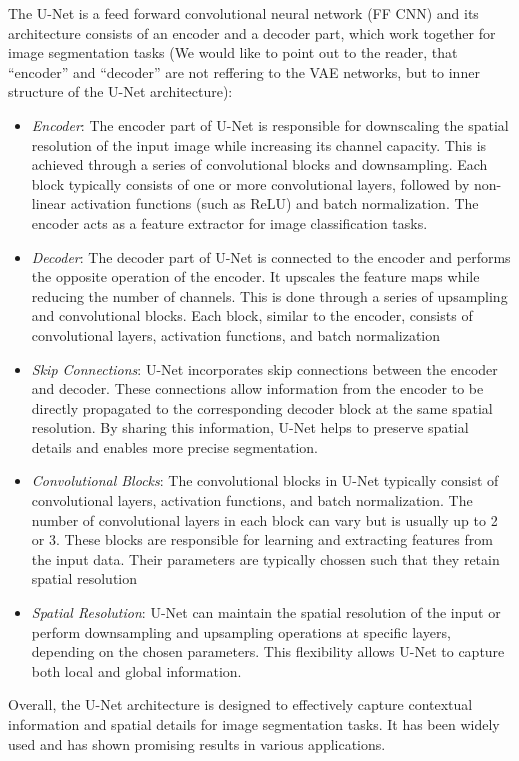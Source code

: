 The U-Net is a feed forward convolutional neural network (FF CNN) and its architecture consists of an encoder and a decoder part, which work together for image segmentation tasks
(We would like to point out to the reader, that ``encoder'' and ``decoder'' are not reffering 
to the VAE networks, but to inner structure of the U-Net architecture):
\begin{itemize}
    \item \textit{Encoder}: The encoder part of U-Net is responsible for downscaling the spatial resolution of the input
     image while increasing its channel capacity. This is achieved through a series of convolutional blocks and downsampling. 
     Each block typically consists of one or more convolutional layers, followed by non-linear activation
    functions (such as ReLU) and batch normalization. The encoder acts as a feature extractor for image
    classification tasks.
    \item \textit{Decoder}: The decoder part of U-Net is connected to the encoder and performs the opposite operation
     of the encoder. It upscales the feature maps while reducing the number of channels. This is done through 
     a series of upsampling and convolutional blocks. Each block, similar to the encoder, consists of convolutional
    layers, activation functions, and batch normalization 

    \item \textit{Skip Connections}: U-Net incorporates skip connections between the encoder and decoder. These 
    connections allow information from the encoder to be directly propagated to the corresponding decoder 
    block at the same spatial resolution. By sharing this information, U-Net helps to preserve spatial details
     and enables more precise segmentation.

    \item \textit{Convolutional Blocks}: The convolutional blocks in U-Net typically consist of convolutional layers, activation 
    functions, and batch normalization. The number of convolutional layers in each block can vary but is usually up to 2 or 3. 
    These blocks are responsible for learning and extracting features from the input data. Their parameters are typically chossen such
    that they retain spatial resolution

    \item \textit{Spatial Resolution}: U-Net can maintain the spatial resolution of the input or perform downsampling and upsampling 
    operations at specific layers, depending on the chosen parameters. This flexibility allows U-Net to
     capture both local and global information.
\end{itemize}
Overall, the U-Net architecture is designed to effectively capture contextual information and spatial details for image segmentation tasks. It has been widely used and has shown promising results in various applications.